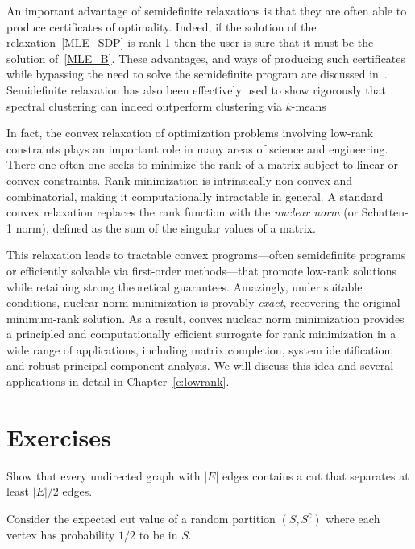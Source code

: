 \begin{remark}
An important advantage of semidefinite relaxations is that they are often able to produce certificates of optimality. Indeed, if the solution of the relaxation~\eqref{MLE_SDP} is rank 1 then the user is sure that it must be the solution of~\eqref{MLE_B}. These advantages, and ways of producing such certificates while bypassing the need to solve the semidefinite program are discussed in~\cite{Bandeira_PCC}.  Semidefinite relaxation has also been effectively used to show rigorously that spectral clustering can indeed outperform clustering via $k$-means~\cite{ling2020certifying,boedihardjo2021performance,deng2021strong}
\end{remark}




\bigskip


In fact, the convex relaxation of optimization problems involving low-rank constraints plays an important role in many areas of science and engineering. There one often one seeks to minimize the rank of a matrix subject to linear or convex constraints. Rank minimization is intrinsically non-convex and combinatorial, making it computationally intractable in general. A standard convex relaxation replaces the rank function with the {\em nuclear norm} (or Schatten-1 norm), defined as the sum of the singular values of a matrix. 

This relaxation leads to tractable convex programs—often semidefinite programs or efficiently solvable via first-order methods—that promote low-rank solutions while retaining strong theoretical guarantees. Amazingly, under suitable conditions, nuclear norm minimization is provably {\em exact}, recovering the original minimum-rank solution. As a result, convex nuclear norm minimization provides a principled and computationally efficient surrogate for rank minimization in a wide range of applications, including matrix completion, system identification, and robust principal component analysis. We will discuss this idea and several applications in detail in Chapter~\ref{c:lowrank}.





\section*{Exercises}

\begin{myexercise}
\label{prob:max-cut-bound}
Show that every undirected graph with $|E|$ edges contains a cut that separates at least $|E|/2$ edges.
\begin{hint}
Consider the expected cut value of a random partition $(S,S^c)$ where each vertex has probability $1/2$ to be in $S$.   
\end{hint}
\end{myexercise}


